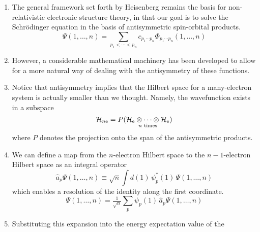 \begin{enumerate}
    \item
        The general framework set forth by Heisenberg remains the basis for
        non-relativistic electronic structure theory, in that our goal is to
        solve the Schr\"odinger equation in the basis of antisymmetric
        spin-orbital products.
        \begin{equation}
            \Psi(1, \ldots, n)
            =
            \sum_{p_1<\cdots<p_n}
            c_{p_1\cdots p_n}
            \Phi_{p_1\cdots p_n}(1, \ldots, n)
        \end{equation}
    \item
        However, a considerable mathematical machinery has been developed to
        allow for a more natural way of dealing with the antisymmetry of these
        functions.
    \item
        Notice that antisymmetry implies that the Hilbert space for a
        many-electron system is actually smaller than we thought.
        Namely, the wavefunction exists in a subspace
        \begin{equation}
            \mathcal{H}_{n\mathrm{e}}
            =
            P(
                \underset{\text{$n$ times}}{%
                    \mathcal{H}_\mathrm{e}
                    \otimes\cdots
                    \otimes
                    \mathcal{H}_\mathrm{e}
                }
            )
        \end{equation}
        where \(P\) denotes the projection onto the span of the antisymmetric
        products.
    \item
        We can define a map from the \(n\)-electron Hilbert space to the
        \(n-1\)-electron Hilbert space as an integral operator
        \begin{equation}
            \hat{a}_p
            \Psi(1, \ldots, n)
            \equiv
            \sqrt{n}
            \int
            d(1)\,
            \psi_p^*(1)\,
            \Psi(1, \ldots, n)
        \end{equation}
        which enables a resolution of the identity along the first coordinate.
        \begin{equation}
            \Psi(1, \ldots, n)
            =
            \tfrac{1}{\sqrt{n}}
            \sum_p
            \psi_p(1)\,
            \hat{a}_p
            \Psi(1, \ldots, n)
        \end{equation}
    \item
        Substituting this expansion into the energy expectation value of the

\end{enumerate}
